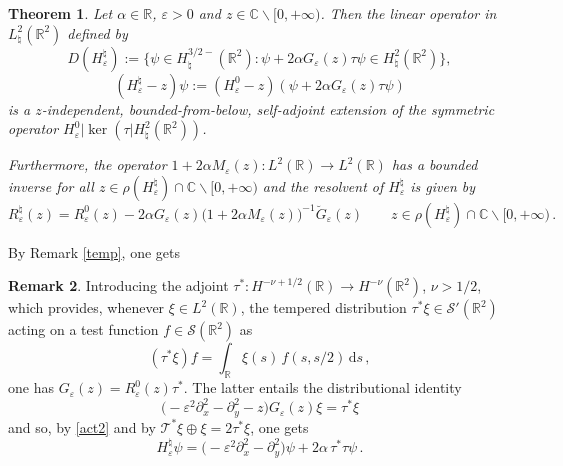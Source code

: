 \documentclass[a4paper,11pt,reqno]{amsart}
\newtheorem{theorem}{Theorem}[section]
\theoremstyle{definition}
\newtheorem{remark}[theorem]{Remark}
\numberwithin{equation}{section}
\newcommand{\CO}{\mathbb C}
\newcommand{\RE}{\mathbb R}
\newcommand{\Tau}{\mathcal{T}}
\renewcommand{\SS}{\mathcal S}
\newcommand{\ve}{\varepsilon}
\renewcommand{\d}{\mathrm{d}}
\newcommand{\bosfer}{{\natural}}
\newcommand{\be}{\begin{equation}}
\newcommand{\ee}{\end{equation}}
\begin{document}
\begin{theorem}\label{th:resolvent-main}
Let $\alpha \in\RE$, $\ve>0$ and $z\in \CO\backslash[0,+\infty)$. Then the linear operator in $L^{2}_{\bosfer}(\RE^{2})$ defined by 
\[
D(H^\bosfer_\ve) := \big\{ \psi \in H_{\bosfer}^{3/2-}(\RE^2): \psi+2\alpha G_{\ve}(z)\tau\psi \in H_{\bosfer}^{2}(\RE^2) \big\}, 
\]
  \begin{equation*}%
 (H^\bosfer_\ve -z) \psi   := (H^{0}_{\ve} -z ) (\psi+2\alpha G_{\ve}(z)\tau\psi )
  \end{equation*}
is a $z$-independent, bounded-from-below, self-adjoint extension of the symmetric operator $H^{0}_{\ve}|\ker(\tau|H^{2}_{\bosfer}(\RE^{2}))$. \par 
Furthermore, the operator $1  + 2\alpha M_{\ve}(z): L^2(\RE)\to L^2(\RE)$ has a bounded inverse for all $z\in   
\rho(H^\bosfer_\ve)\cap \CO\backslash[0,+\infty)$ and the resolvent of   $H^\bosfer_\ve$ is given by 
\be\label{krein-b}
R^{\bosfer}_{\ve}(z) = R^{0}_{\ve}(z) - 2\alpha G_{\ve}(z)\big(1  +2\alpha M_{\ve}(z)\big)^{-1} \breve G_{\ve}(z) \qquad  z\in \rho(H^\bosfer_\ve)\cap \CO\backslash[0,+\infty)\,.
\ee
\end{theorem}
By Remark \ref{temp}, one gets
\begin{remark}\label{r:temp-b} Introducing the adjoint 
$\tau^{*}:H^{-\nu+1/2}(\RE)\to H^{-\nu}(\RE^{2})$, $\nu>1/2$, which provides, whenever $\xi\in L^{2}(\RE)$, the tempered distribution $\tau^{*}\xi\in \SS'(\RE^{2})$ acting on a test function $f\in\SS(\RE^{2})$ as
\[
(\tau^{*}\xi)f=\int_{\RE}\xi(s)\,f(s,s/2)\,\d s\,,
\]
one has $G_{\ve}(z)=R^{0}_{ \ve}(z)\tau^{*}$. The latter entails the distributional identity 
\begin{equation*}%
\big(-\ve^2 \partial^2_{x}-\partial^2_{y}-z\big)G_{\ve}(z)\xi=\tau^{*}\xi
\end{equation*}
and so, by \eqref{act2} and by $\Tau^{*}\xi\oplus\xi=2\tau^{*}\xi$, one gets
\[
 H^\bosfer_\ve\psi=\big( -\ve^2 \partial^2_{x}-\partial^2_{y}\big)\psi+2\alpha\,\tau^{*}\tau\psi\,.
\]
\end{remark}
\end{document}
